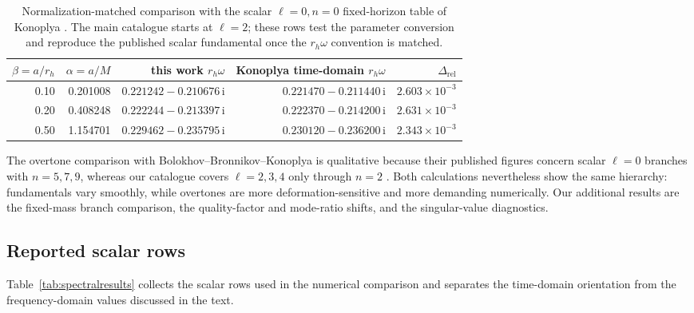 \documentclass[12pt,a4paper]{article}
\newcommand{\ii}{\mathrm{i}}
\begin{document}
\begin{table}[H]
\centering
\footnotesize
\renewcommand{\arraystretch}{1.14}
\begin{tabular}{rrrrr}
\toprule
\(\beta=a/r_h\) & \(\alpha=a/M\) &
this work \(r_h\omega\) & Konoplya time-domain \(r_h\omega\) &
\(\Delta_{\mathrm{rel}}\)\\
\midrule
0.10 & 0.201008 & \(0.221242-0.210676\,\ii\) & \(0.221470-0.211440\,\ii\) & \(2.603\times10^{-3}\)\\
0.20 & 0.408248 & \(0.222244-0.213397\,\ii\) & \(0.222370-0.214200\,\ii\) & \(2.631\times10^{-3}\)\\
0.50 & 1.154701 & \(0.229462-0.235795\,\ii\) & \(0.230120-0.236200\,\ii\) & \(2.343\times10^{-3}\)\\
\bottomrule
\end{tabular}
\color{blue}
\caption{Normalization-matched comparison with the scalar \(\ell=0,n=0\)
fixed-horizon table of Konoplya \cite{Konoplya2020}. The main catalogue starts
at \(\ell=2\); these rows test the parameter conversion and reproduce the
published scalar fundamental once the \(r_h\omega\) convention is matched.}
\color{black}
\label{tab:konoplyacomparison}
\end{table}

\color{blue}
The overtone comparison with Bolokhov--Bronnikov--Konoplya is qualitative
because their published figures concern scalar \(\ell=0\) branches with
\(n=5,7,9\), whereas our catalogue covers \(\ell=2,3,4\) only through \(n=2\)
\cite{Bolokhov2025}. Both calculations nevertheless show the same hierarchy:
fundamentals vary smoothly, while overtones are more deformation-sensitive and
more demanding numerically. Our additional results are the fixed-mass branch
comparison, the quality-factor and mode-ratio shifts, and the singular-value
diagnostics.
\color{black}
\FloatBarrier

\color{blue}
\subsection{Reported scalar rows}
\color{black}

\color{blue}
Table~\ref{tab:spectralresults} collects the scalar rows used in the numerical
comparison and separates the time-domain orientation from the frequency-domain
values discussed in the text.
\color{black}
\end{document}

